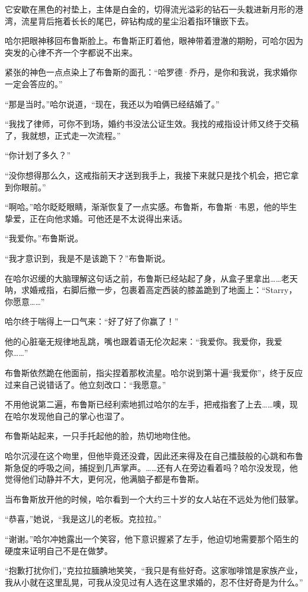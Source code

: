 \documentclass[../main]{subfiles}
\begin{document}
它安歇在黑色的衬垫上，主体是白金的，切得流光溢彩的钻石一头栽进新月形的港湾，流星背后拖着长长的尾巴，碎钻构成的星尘沿着指环镶嵌下去。

哈尔把眼神移回布鲁斯脸上。布鲁斯正盯着他，眼神带着澄澈的期盼，可哈尔因为突发的心律不齐一个字都说不出来。

紧张的神色一点点染上了布鲁斯的面孔：“哈罗德·乔丹，是你和我说，我求婚你一定会答应的。”

“那是当时。”哈尔说道，“现在，我还以为咱俩已经结婚了。”

“我找了律师，可你不到场，婚约书没法公证生效。我找的戒指设计师又终于交稿了，我就想，正式走一次流程。”

“你计划了多久？”

“没你想得那么久，这戒指前天才送到我手上，我接下来就只是找个机会，把它拿到你眼前。”

“啊哈。”哈尔眨眨眼睛，渐渐恢复了一点实感。布鲁斯，布鲁斯·韦恩，他的毕生挚爱，正在向他求婚。可他还是不太说得出来话。

“我爱你。”布鲁斯说。

“我才意识到，我是不是该跪下？”布鲁斯说。

在哈尔迟缓的大脑理解这句话之前，布鲁斯已经站起了身，从盒子里拿出……老天呐，求婚戒指，右脚后撤一步，包裹着高定西装的膝盖跪到了地面上：“Starry，你愿意\ldots\ldots”

哈尔终于喘得上一口气来：“好了好了你赢了！”

他的心脏毫无规律地乱跳，嘴也跟着语无伦次起来：“我爱你。我爱你，我爱你\ldots\ldots”

布鲁斯依然跪在他面前，指尖捏着那枚流星。哈尔说到第十遍“我爱你”，终于反应过来自己说错话了。他立刻改口：“我愿意。”

不用他说第二遍，布鲁斯已经利索地抓过哈尔的左手，把戒指套了上去……噢，现在哈尔发现他自己的掌心也湿了。

布鲁斯站起来，一只手托起他的脸，热切地吻住他。

哈尔沉浸在这个吻里，但他毕竟还没聋，因此还来得及在自己擂鼓般的心跳和布鲁斯急促的呼吸之间，捕捉到几声掌声。……还有人在旁边看着吗？哈尔没发现，他觉得他们动静并不大，更何况，他满脑子都是布鲁斯。

当布鲁斯放开他的时候，哈尔看到一个大约三十岁的女人站在不远处为他们鼓掌。

“恭喜，”她说，“我是这儿的老板。克拉拉。”

“谢谢。”哈尔冲她露出一个笑容，他下意识握紧了左手，他迫切地需要那个陌生的硬度来证明自己不是在做梦。

“抱歉打扰你们，”克拉拉腼腆地笑笑，“我只是有些好奇。这家咖啡馆是家族产业，我从小就在这里乱晃，可我从没见过有人选在这里求婚的，忍不住好奇是为什么。”
\end{document}
